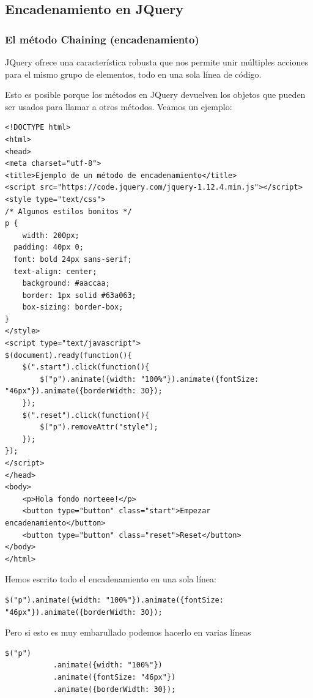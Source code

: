 \documentclass[a4paper, oneside]{article}
\begin{document}
\subsection{Encadenamiento en JQuery}
\label{sec:org54e28b4}

\subsubsection{El método Chaining (encadenamiento)}
\label{sec:org786dc02}

JQuery ofrece una característica robusta que nos permite unir múltiples acciones para el mismo grupo de elementos, todo en una sola línea de código.

Esto es posible porque los métodos en JQuery devuelven los objetos que pueden ser usados para llamar a otros métodos. Veamos un ejemplo:

\begin{verbatim}
<!DOCTYPE html>
<html>
<head>
<meta charset="utf-8">
<title>Ejemplo de un método de encadenamiento</title>
<script src="https://code.jquery.com/jquery-1.12.4.min.js"></script>
<style type="text/css">
/* Algunos estilos bonitos */
p {
    width: 200px;
  padding: 40px 0;
  font: bold 24px sans-serif;
  text-align: center;
    background: #aaccaa;
    border: 1px solid #63a063;
    box-sizing: border-box;
}
</style>
<script type="text/javascript">
$(document).ready(function(){
    $(".start").click(function(){
        $("p").animate({width: "100%"}).animate({fontSize: "46px"}).animate({borderWidth: 30});
    });
    $(".reset").click(function(){
        $("p").removeAttr("style");
    });
});  
</script>
</head>
<body>
    <p>Hola fondo norteee!</p>
    <button type="button" class="start">Empezar encadenamiento</button>
    <button type="button" class="reset">Reset</button>
</body>
</html>                                		
\end{verbatim}

Hemos escrito todo el encadenamiento en una sola línea:

\begin{verbatim}
$("p").animate({width: "100%"}).animate({fontSize: "46px"}).animate({borderWidth: 30});
\end{verbatim}

Pero si esto es muy embarullado podemos hacerlo en varias líneas

\begin{verbatim}
$("p")
           .animate({width: "100%"})
           .animate({fontSize: "46px"})
           .animate({borderWidth: 30});
\end{verbatim}
\end{document}

